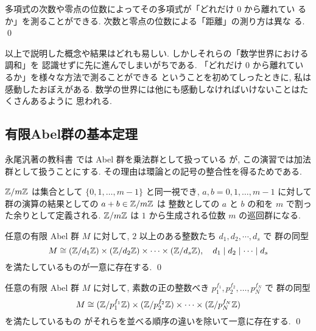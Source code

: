 \documentclass[12pt,twoside]{jarticle}
\begin{document}
\begin{summary}
 多項式の次数や零点の位数によってその多項式が「どれだけ $0$ から離れてい
 るか」を測ることができる. 次数と零点の位数による「距離」の測り方は異な
 る.  \qed
\end{summary}

以上で説明した概念や結果はどれも易しい.
しかしそれらの「数学世界における調和」を
認識せずに先に進んでしまいがちである.
「どれだけ $0$ から離れているか」を様々な方法で測ることができる
ということを初めてしったときに, 私は感動したおぼえがある.
数学の世界には他にも感動しなければいけないことはたくさんあるように
思われる.


\subsection{有限Abel群の基本定理}

永尾汎著の教科書 \cite{nagao-1983} では Abel 群を乗法群として扱っている
が, この演習では加法群として扱うことにする.
その理由は環論との記号の整合性を得るためである.

${\mathbb Z}/m{\mathbb Z}$ は集合として $\{0,1,\ldots,m-1\}$ と同一視でき, 
$a,b=0,1,\ldots,m-1$ に対して群の演算の結果としての $a+b\in{\mathbb Z}/m{\mathbb Z}$ は %
整数としての $a$ と $b$ の和を $m$ で割った余りとして定義される.
${\mathbb Z}/m{\mathbb Z}$ は $1$ から生成される位数 $m$ の巡回群になる.

\begin{theorem}[有限Abel群の基本定理1]
 任意の有限 Abel 群 $M$ に対して, %
 $2$ 以上のある整数たち $d_1,d_2,\cdots,d_s$ で
 群の同型
 \begin{equation*}
  M \cong 
  ({\mathbb Z}/d_1{\mathbb Z})\times({\mathbb Z}/d_2{\mathbb Z})\times\cdots\times({\mathbb Z}/d_s{\mathbb Z}),
  \quad
  d_1\mid d_2\mid\cdots\mid d_s
 \end{equation*}
 を満たしているものが一意に存在する.
 \qed
\end{theorem}

\begin{theorem}[有限Abel群の基本定理2]
 任意の有限 Abel 群 $M$ に対して, %
 素数の正の整数べき $p_1^{f_1}, p_2^{f_2},\ldots, p_N^{f_N}$ で
 群の同型
 \begin{equation*}
  M \cong 
  ({\mathbb Z}/p_1^{f_1}{\mathbb Z})\times({\mathbb Z}/p_2^{f_2}{\mathbb Z})\times\cdots\times({\mathbb Z}/p_N^{f_N}{\mathbb Z})
 \end{equation*}
 を満たしているもの
 がそれらを並べる順序の違いを除いて一意に存在する.
 \qed
\end{theorem}
\end{document}
